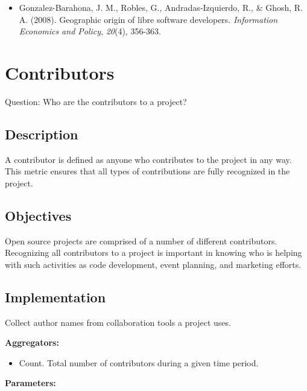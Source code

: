 \documentclass[
  12pt,
]{article}
\providecommand{\tightlist}{%
  \setlength{\itemsep}{0pt}\setlength{\parskip}{0pt}}
\begin{document}
\begin{itemize}
\tightlist
\item
  Gonzalez-Barahona, J. M., Robles, G., Andradas-Izquierdo, R., \&
  Ghosh, R. A. (2008). Geographic origin of libre software developers.
  \emph{Information Economics and Policy}, \emph{20}(4), 356-363.
\end{itemize}

\hypertarget{contributors}{%
\section{Contributors}\label{contributors}}

Question: Who are the contributors to a project?

\hypertarget{description-8}{%
\subsection{Description}\label{description-8}}

A contributor is defined as anyone who contributes to the project in any
way. This metric ensures that all types of contributions are fully
recognized in the project.

\hypertarget{objectives-8}{%
\subsection{Objectives}\label{objectives-8}}

Open source projects are comprised of a number of different
contributors. Recognizing all contributors to a project is important in
knowing who is helping with such activities as code development, event
planning, and marketing efforts.

\hypertarget{implementation-8}{%
\subsection{Implementation}\label{implementation-8}}

Collect author names from collaboration tools a project uses.

\textbf{Aggregators:}

\begin{itemize}
\tightlist
\item
  Count. Total number of contributors during a given time period.
\end{itemize}

\textbf{Parameters:}
\end{document}

